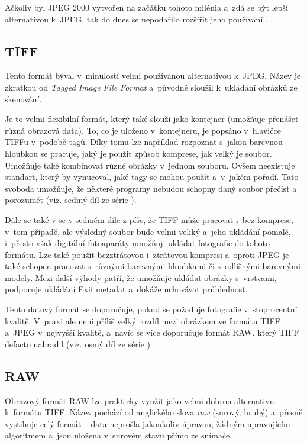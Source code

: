 Ačkoliv byl JPEG 2000 vytvořen na začátku tohoto milénia a~zdá se být lepší alternativou k~JPEG, tak do dnes se nepodařilo rozšířit jeho používání \cite{JPEG2000}.

\subsection*{TIFF}
Tento formát býval v~minulostí velmi používanou alternativou k~JPEG. Název je zkratkou od \textit{Tagged Image File Format} a~původně sloužil k~ukládání obrázků ze skenování.

Je to velmi flexibilní formát, který také slouží jako kontejner (umožňuje přenášet různá obrazová data). To, co je uloženo v~kontejneru, je popsáno v~hlavičce TIFFu v~podobě tagů. Díky tomu lze například rozpoznat s~jakou barevnou hloubkou se pracuje, jaký je použit způsob komprese, jak velký je soubor. Umožňuje také kombinovat různé obrázky v~jednom souboru. Ovšem neexistuje standart, který by vynucoval, jaké tagy se mohou použít a~v~jakém pořadí. Tato svoboda umožňuje, že některé programy nebudou schopny daný soubor přečíst a porozumět (viz. sedmý díl ze série \cite{datove_formaty_web}).

Dále se také v se v sedmém díle z \cite{datove_formaty_web} píše, že TIFF může pracovat i~bez komprese, v~tom případě, ale výsledný soubor bude velmi veliký a~jeho ukládání pomalé, i~přesto však digitální fotoaparáty umožňuji ukládat fotografie do tohoto formátu.  Lze také použít bezztrátovou i~ztrátovou kompresi a~oproti JPEG je také schopen pracovat s~různými barevnými hloubkami či s~odlišnými barevnými modely. Mezi další výhody patří, že umožňuje ukládat obrázky s~vrstvami, podporuje ukládání Exif metadat a~dokáže uchovávat průhlednost.

Tento datový formát se doporučuje, pokud se požaduje fotografie v~stoprocentní kvalitě. V~praxi ale není příliš velký rozdíl mezi obrázkem ve formátu TIFF a~JPEG v~nejvyšší kvalitě, a~navíc se více doporučuje formát RAW, který TIFF defacto nahradil (viz. osmý díl ze série \cite{datove_formaty_web}) .

\subsection*{RAW}
Obrazový formát RAW lze prakticky využít jako velmi dobrou alternativu k~formátu TIFF. Název pochází od anglického slova \textit{raw} (surový, hrubý) a~přesně vystihuje celý formát\,–-\,data neprošla jakoukoliv úpravou, žádným upravujícím algoritmem a~jsou uložena v~surovém stavu přímo ze snímače.

